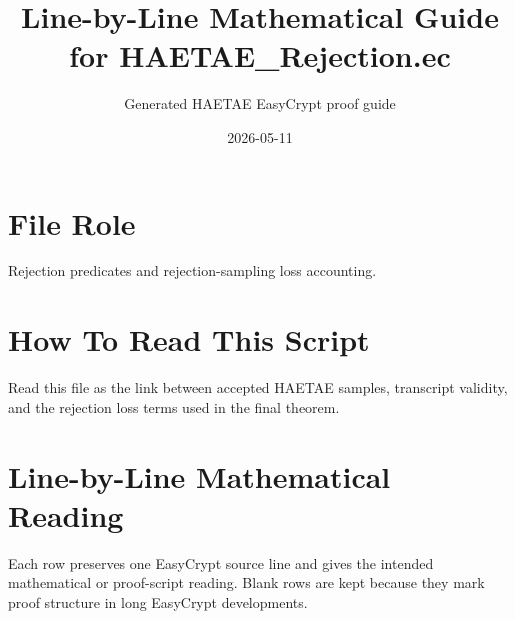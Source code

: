 \documentclass[10pt]{article}
\title{Line-by-Line Mathematical Guide for HAETAE\_Rejection.ec}
\author{Generated HAETAE EasyCrypt proof guide}
\date{2026-05-11}
\begin{document}
\maketitle

\section*{File Role}
Rejection predicates and rejection-sampling loss accounting.

\section*{How To Read This Script}
Read this file as the link between accepted HAETAE samples, transcript validity, and the rejection loss terms used in the final theorem.

\section*{Line-by-Line Mathematical Reading}
Each row preserves one EasyCrypt source line and gives the intended mathematical
or proof-script reading.  Blank rows are kept because they mark proof structure
in long EasyCrypt developments.
\end{document}
